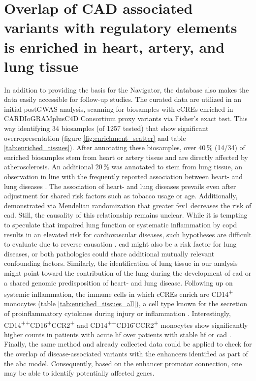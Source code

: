 \section{Overlap of CAD associated variants with regulatory elements is enriched in heart, artery, and lung tissue}
In addition to providing the basis for the  Navigator, the database also makes the data easily accessible for follow-up studies. The curated data are utilized in an initial postGWAS analysis, scanning for biosamples with \acp{cCRE} enriched in CARDIoGRAMplusC4D Consortium \cite{aragamDiscoverySystematicCharacterization2021s} proxy variants via Fisher's exact test. This way identifying 34 biosamples (of 1257 tested) that show significant overrepresentation (figure \ref{fig:enrichment_scatter} and table \ref{tab:enriched_tissues}). After annotating these biosamples, over 40\,\% (14/34) of enriched biosamples stem from heart or artery tissue and are directly affected by atherosclerosis. An additional 20\,\% was annotated to stem from lung tissue, an observation in line with the frequently reported association between heart- and lung diseases \cite{carterAssociationCardiovascularDisease2019, hanPulmonaryDiseasesHeart2007}. The association of heart- and lung diseases prevails even after adjustment for shared risk factors such as tobacco usage or age. Additionally, \textcite{auyeungAssociationGeneticInstrumental2018} demonstrated via Mendelian randomization that greater \ac{fev1} decreases the risk of \ac{cad}. Still, the causality of this relationship remains unclear. While it is tempting to speculate that impaired lung function or systematic inflammation by \ac{copd} results in an elevated risk for cardiovascular diseases, such hypotheses are difficult to evaluate due to reverse causation \cite{nowakLungFunctionCoronary2018}. \ac{cad} might also be a risk factor for lung diseases, or both pathologies could share additional mutually relevant confounding factors. Similarly, the identification of lung tissue in our analysis might point toward the contribution of the lung during the development of \ac{cad} or a shared genomic predisposition of heart- and lung disease. Following up on systemic inflammation, the immune cells in which \acp{cCRE} enrich are CD14\textsuperscript{+} monocytes (table \ref{tab:enriched_tissues_all}), a cell type known for the secretion of proinflammatory cytokines during injury or inflammation \cite{kapellosHumanMonocyteSubsets2019}. Interestingly, CD14\textsuperscript{++}CD16\textsuperscript{+}CCR2\textsuperscript{+} and CD14\textsuperscript{++}CD16\textsuperscript{-}CCR2\textsuperscript{+} monocytes show significantly higher counts in patients with acute \ac{hf} over patients with stable \ac{hf} or \ac{cad} \cite{wrigleyCD14CD16Monocytes2013}.
\pagebreak
Finally, the same method and already collected data could be applied to check for the overlap of disease-associated variants with the enhancers identified as part of the \ac{abc} model. Consequently, based on the enhancer promotor connection, one may be able to identify potentially affected genes.
